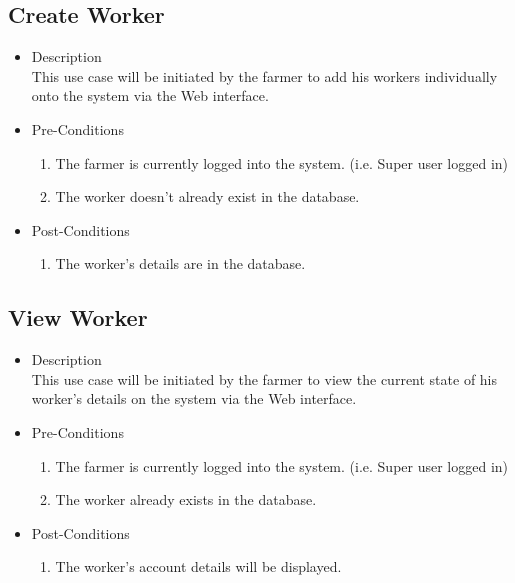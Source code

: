 \documentclass[11pt,fleqn]{book} %
\begin{document}
	\subsection{Create Worker}
	\begin{itemize}
		\item Description\\
		This use case will be initiated by the farmer to add his workers individually onto the system via the Web interface.
		\item Pre-Conditions
		\begin{enumerate}
			\item The farmer is currently logged into the system. (i.e. Super user logged in)
			\item The worker doesn’t already exist in the database.
		\end{enumerate}
		\item Post-Conditions
		\begin{enumerate}
			\item The worker’s details are in the database.			
		\end{enumerate}
	\end{itemize}
	
	\subsection{View Worker}
	\begin{itemize}
		\item Description\\
		This use case will be initiated by the farmer to view the current state of his worker’s details on the system via the Web interface.
		\item Pre-Conditions
		\begin{enumerate}
			\item The farmer is currently logged into the system. (i.e. Super user logged in)
			\item The worker already exists in the database.					
		\end{enumerate}
		\item Post-Conditions
		\begin{enumerate}
			\item The worker’s account details will be displayed.
		\end{enumerate}
	\end{itemize}
	
\end{document}
